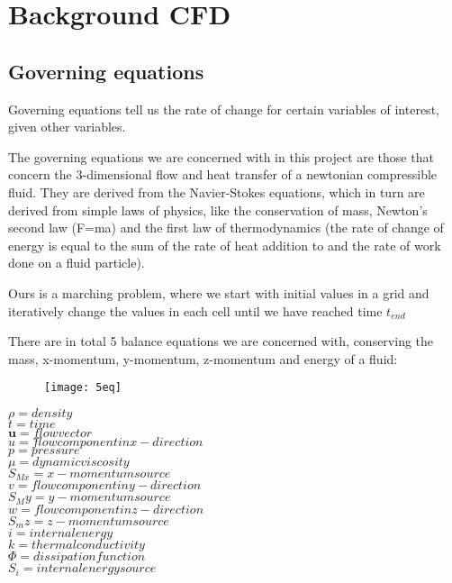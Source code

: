 
\chapter{Background CFD} %

\label{cfdintro} %

\section{Governing equations}

Governing equations tell us the rate of change for certain variables of interest, given other variables.

The governing equations we are concerned with in this project are those that concern the 3-dimensional flow and heat transfer of a newtonian compressible fluid. They are derived from the Navier-Stokes equations, which in turn are derived from simple laws of physics, like the conservation of mass, Newton's second law (F=ma) and the first law of thermodynamics (the rate of change of energy is equal to the sum of the rate of heat addition to and the rate of work done on a fluid particle).

Ours is a marching problem, where we start with initial values in a grid and iteratively change the values in each cell until we have reached time $t_{end}$

There are in total 5 balance equations we are concerned with, conserving the mass, x-momentum, y-momentum, z-momentum and energy of a fluid:

\begin{figure}[h]
\texttt{[image: 5eq]}
\end{figure}

$\rho = density$ \\
$t = time$ \\
$\mathbf{u} = flow vector$\\
$u = flow component in x-direction$ \\
$p = pressure$ \\
$\mu = dynamic viscosity$\\
$S_{Mx} = x-momentum source$ \\
$v = flow component in y-direction$ \\
$S_My = y-momentum source$ \\
$w = flow component in z-direction$ \\
$S_mz = z-momentum source$ \\
$i = internal energy$ \\
$k = thermal conductivity$ \\
$\Phi = dissipation function$ \\
$S_i = internal energy source$

